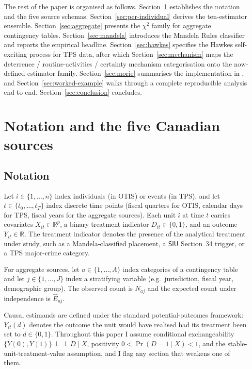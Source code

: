 \documentclass[article,shortnames,nojss]{jss}
\providecommand{\Rset}{\mathbb{R}}
\newcommand{\indep}{\perp\!\!\!\perp}
\newcommand{\SIU}{\textsf{SIU}}
\begin{document}
The rest of the paper is organised as follows.
Section~\ref{sec:notation} establishes the notation and the five
source schemas. Section~\ref{sec:per-individual} derives the
ten-estimator ensemble. Section~\ref{sec:aggregate} presents the
$\chi^{2}$ family for aggregate contingency tables.
Section~\ref{sec:mandela} introduces the Mandela Rules classifier
and reports the empirical headline.  Section~\ref{sec:hawkes}
specifies the Hawkes self-exciting process for TPS data, after
which Section~\ref{sec:mechanism} maps the
deterrence / routine-activities / certainty mechanism
categorisation onto the now-defined estimator family.
Section~\ref{sec:morie} summarises the implementation in ,
and Section~\ref{sec:worked-example} walks through a complete
reproducible analysis end-to-end.  Section~\ref{sec:conclusion}
concludes.

\section{Notation and the five Canadian sources}
\label{sec:notation}

\subsection{Notation}

Let $i \in \{1, \dots, n\}$ index individuals (in OTIS) or events
(in TPS), and let $t \in \{t_0, \dots, t_T\}$ index discrete time
points (fiscal quarters for OTIS, calendar days for TPS, fiscal
years for the aggregate sources). Each unit $i$ at time $t$
carries covariates $X_{it} \in \Rset^{p}$, a binary treatment
indicator $D_{it} \in \{0,1\}$, and an outcome $Y_{it} \in \Rset$.
The treatment indicator denotes the presence of the analytical
treatment under study, such as a Mandela-classified placement, a
$\SIU$ Section~34 trigger, or a TPS major-crime category.

For aggregate sources, let $a \in \{1, \dots, A\}$ index categories
of a contingency table and let $j \in \{1, \dots, J\}$ index a
stratifying variable (e.g.\ jurisdiction, fiscal year, demographic
group). The observed count is $N_{aj}$ and the expected count under
independence is $\hat{E}_{aj}$.

Causal estimands are defined under the standard potential-outcomes
framework: $Y_{it}(d)$ denotes the outcome the unit would have
realised had its treatment been set to $d \in \{0,1\}$. Throughout this paper I assume conditional exchangeability
$\{Y(0), Y(1)\} \indep D \mid X$, positivity $0 < \Pr(D=1 \mid
X) < 1$, and the stable-unit-treatment-value assumption, and I
flag any section that weakens one of them.
\end{document}
